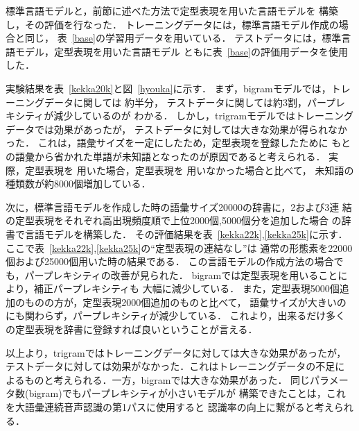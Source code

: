 標準言語モデルと，前節に述べた方法で定型表現を用いた言語モデルを
構築し，その評価を行なった．
トレーニングデータには，標準言語モデル作成の場合と同じ，
表~\ref{base}の学習用データを用いている．
テストデータには，標準言語モデル，定型表現を用いた言語モデル
ともに表~\ref{base}の評価用データを使用した．

実験結果を表~\ref{kekka20k}と図~\ref{hyouka}に示す．
まず，bigramモデルでは，トレーニングデータに関しては\break
約半分，
テストデータに関しては約3割，パープレキシティが減少しているのが
わかる．
しかし，trigramモデルではトレーニングデータでは効果があったが，
テストデータに対しては大きな効果が得られなかった．
これは，語彙サイズを一定にしたため，定型表現を登録したために
もとの語彙から省かれた単語が未知語となったのが原因であると考えられる．
実際，定型表現を\break
用いた場合，定型表現を
用いなかった場合と比べて，
未知語の種類数が約8000個増加している．

次に，標準言語モデルを作成した時の語彙サイズ20000の辞書に，2および3連
結の定型表現をそれぞれ高出現頻度順で上位2000個,5000個分を追加した場合
の辞書で言語モデルを構築した．
その評価結果を表~\ref{kekka22k},\ref{kekka25k}に示す．
ここで表~\ref{kekka22k},\ref{kekka25k}の``定型表現の連結なし''は
\mbox{通常の形態素}を22000個および25000個用いた時の結果である．
この言語モデルの作成方法の場合でも，パープレキシティの改善が見られた．
bigramでは定型表現を用いることにより，補正パープレキシティも
大幅に減少している．
また，定型表現5000個追加のものの方が，\mbox{定型表現2000個追加の}ものと比べて，
語彙サイズが大きいのにも関わらず，パープレキシティが減少している．
これより，出来るだけ多くの定型表現を辞書に登録すれば良いということが言える．

以上より，trigramではトレーニングデータに対しては大きな効果があったが，
テストデータに対しては効果がなかった．これはトレーニングデータの不足に
よるものと考えられる．一方，bigramでは大きな効果があった．
同じパラメータ数(bigram)でも\mbox{パープレキシティが小さ}いモデルが
構築できたことは，これを大語彙連続音声認識の第1パスに使用すると
認識率の向上に繋がると考えられる．



